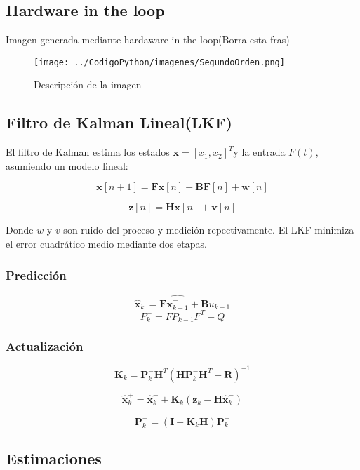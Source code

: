 \documentclass[conference]{IEEEtran}
\begin{document}
\subsection{Hardware in the loop}

Imagen generada mediante hardaware in the loop(Borra esta fras)
\begin{figure}[h]
    \centering
    \texttt{[image: ../CodigoPython/imagenes/SegundoOrden.png]}
    \caption{Descripción de la imagen}
    \label{fig:etiqueta}
\end{figure}

\subsection{Filtro de Kalman Lineal(LKF)}

El filtro de Kalman estima los estados $\textbf{x} = [x_1, x_2]^T$y la entrada $F(t)$, asumiendo un modelo lineal:

\[
	\mathbf{x}[n + 1] = \textbf{F} \textbf{x}[n] + \textbf{B}\textbf{F}[n] + \textbf{w} [n]
\]

\[
	\textbf{z}[n] = \textbf{H} \textbf{x}[n] + \textbf{v}[n]
\]

Donde $w$ y $v$ son ruido del proceso y medici\'on repectivamente. El LKF minimiza el error cuadr\'atico medio mediante dos etapas.

\subsubsection{Predicci\'on}


\[
	\hat{\mathbf{x}}_k^- = \mathbf{F}\hat{\mathbf{x}^+_{k-1}} + \mathbf{B}u_{k-1}
\]
\[
	P^-_k = F P_{k-1}F^T + Q
\]

\subsubsection{Actualizaci\'on}

\[
	\mathbf{K}_k = \mathbf{P}_k^- \mathbf{H}^T \left( \mathbf{H} \mathbf{P}_k^- \mathbf{H}^T + \mathbf{R} \right)^{-1}
\]

\[
	\hat{\mathbf{x}}_k^+ = \hat{\mathbf{x}}_k^- + \mathbf{K}_k \left( \mathbf{z}_k - \mathbf{H} \hat{\mathbf{x}}_k^- \right)
\]

\[
	\mathbf{P}_k^+ = \left( \mathbf{I} - \mathbf{K}_k \mathbf{H} \right) \mathbf{P}_k^-
\]

\subsection{Estimaciones}
\end{document}
